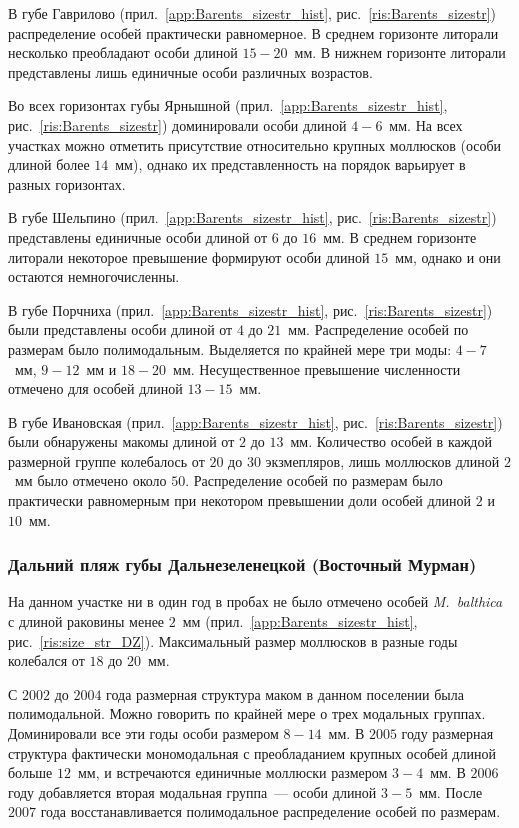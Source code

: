 В губе Гаврилово (прил.~\ref{app:Barents_sizestr_hist}, рис.~\ref{ris:Barents_sizestr}) распределение особей практически равномерное. 
В среднем горизонте литорали несколько преобладают особи длиной $15-20$~мм. 
В нижнем горизонте литорали представлены лишь единичные особи различных возрастов.	

Во всех горизонтах губы Ярнышной (прил.~\ref{app:Barents_sizestr_hist}, рис.~\ref{ris:Barents_sizestr}) доминировали особи длиной $4-6$~мм. 
На всех участках можно отметить присутствие относительно крупных моллюсков (особи длиной более $14$~мм), однако их представленность на порядок варьирует в разных горизонтах.

В губе Шельпино (прил.~\ref{app:Barents_sizestr_hist}, рис.~\ref{ris:Barents_sizestr})  представлены единичные особи длиной от $6$ до $16$~мм. 
В среднем горизонте литорали некоторое превышение формируют особи длиной $15$~мм, однако и они остаются немногочисленны.

В губе Порчниха (прил.~\ref{app:Barents_sizestr_hist}, рис.~\ref{ris:Barents_sizestr}) были представлены особи длиной от $4$ до $21$~мм. 
Распределение особей по размерам было полимодальным. 
Выделяется по крайней мере три моды: $4-7$~мм, $9-12$~мм и $18-20$~мм. 
Несущественное превышение численности  отмечено для особей длиной $13-15$~мм.

В губе Ивановская (прил.~\ref{app:Barents_sizestr_hist}, рис.~\ref{ris:Barents_sizestr}) были обнаружены макомы длиной от $2$ до $13$~мм. 
Количество особей в каждой размерной группе колебалось от $20$ до $30$ экзмепляров, лишь моллюсков длиной $2$~мм было отмечено около $50$. 
Распределение особей по размерам было практически равномерным при некотором превышении доли особей длиной $2$ и $10$~мм. 

		\subsubsection{Дальний пляж губы Дальнезеленецкой (Восточный Мурман)}
На данном участке ни в один год в пробах не было отмечено особей {\it M.~balthica} с длиной раковины менее $2$~мм (прил.~\ref{app:Barents_sizestr_hist}, рис.~\ref{ris:size_str_DZ}). 
Максимальный размер моллюсков в разные годы колебался от $18$ до $20$~мм. 

С $2002$ до $2004$ года размерная структура маком в данном поселении была полимодальной. 
Можно говорить по крайней мере о трех модальных группах.
Доминировали все эти годы особи размером $8 - 14$~мм.
В $2005$ году размерная структура фактически мономодальная с преобладанием крупных особей длиной больше $12$~мм, и встречаются единичные моллюски размером $3 - 4$~мм.
В $2006$ году добавляется вторая модальная группа~--- особи длиной $3 - 5$~мм.
После $2007$ года восстанавливается полимодальное распределение особей по размерам.


